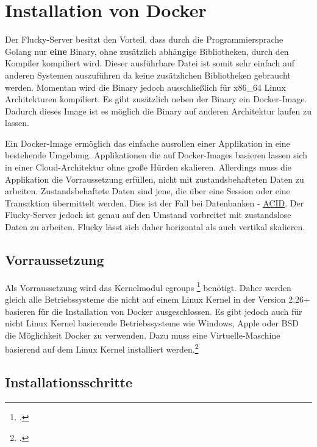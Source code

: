 \section{Installation von Docker}%
\label{sec:docker}

Der Flucky-Server besitzt den Vorteil, dass durch die Programmiersprache Golang
nur \textbf{eine} Binary, ohne zusätzlich abhängige Bibliotheken, durch den
Kompiler kompiliert wird. Dieser ausführbare Datei ist somit sehr einfach auf
anderen Systemen auszuführen da keine zusätzlichen Bibliotheken gebraucht
werden. Momentan wird die Binary jedoch ausschließlich für x86\_64 Linux
Architekturen kompiliert. Es gibt zusätzlich neben der Binary ein Docker-Image.
Dadurch dieses Image ist es möglich die Binary auf anderen Architektur laufen zu
lassen.

Ein Docker-Image ermöglich das einfache ausrollen einer Applikation in eine
bestehende Umgebung. Applikationen die auf Docker-Images basieren lassen sich in
einer Cloud-Architektur ohne große Hürden skalieren. Allerdings muss die
Applikation die Vorraussetzung erfüllen, nicht mit zustandsbehafteten Daten zu
arbeiten. Zustandsbehaftete Daten sind jene, die über eine Session oder eine
Transaktion übermittelt werden. Dies ist der Fall bei Datenbanken -
\href{https://de.wikipedia.org/wiki/ACID}{ACID}. Der Flucky-Server jedoch ist
genau auf den Umstand vorbreitet mit zustandslose Daten zu arbeiten. Flucky
lässt sich daher horizontal als auch vertikal skalieren.

\subsection{Vorraussetzung}%
\label{sec:docker.vorraussetzung}

Als Vorraussetzung wird das Kernelmodul cgroups \footcite{cgroups} benötigt.
Daher werden gleich alle Betriebssysteme die nicht auf einem Linux Kernel in der
Version 2.26+ basieren für die Installation von Docker ausgeschlossen. Es gibt
jedoch auch für nicht Linux Kernel basierende Betriebssysteme wie Windows, Apple
oder BSD die Möglichkeit Docker zu verwenden. Dazu muss eine Virtuelle-Maschine
basierend auf dem Linux Kernel installiert werden.\footcite{moby}

\subsection{Installationsschritte}%
\label{sec:docker.installation}

